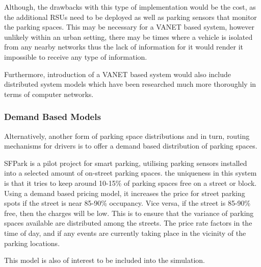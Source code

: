 Although, the drawbacks with this type of implementation would be the cost, as the additional RSUs need to be deployed as well as parking sensors that monitor the parking spaces. This may be necessary for a VANET based system, however unlikely within an urban setting, there may be times where a vehicle is isolated from any nearby networks thus the lack of information for it would render it impossible to receive any type of information.

Furthermore, introduction of a VANET based system would also include distributed system models which have been researched much more thoroughly in terms of computer networks.

\subsubsection{Demand Based Models}
Alternatively, another form of parking space distributions and in turn, routing mechanisms for drivers is to offer a demand based distribution of parking spaces.

SFPark \cite{12} is a pilot project for smart parking, utilising parking sensors installed into a selected amount of on-street parking spaces. the uniqueness in this system is that it tries to keep around 10-15\% of parking spaces free on a street or block. Using a demand based pricing model, it increases the price for street parking spots if the street is near 85-90\% occupancy. Vice versa, if the street is 85-90\% free, then the charges will be low. This is to ensure that the variance of parking spaces available are distributed among the streets. The price rate factors in the time of day, and if any events are currently taking place in the vicinity of the parking locations.

This model is also of interest to be included into the simulation.

